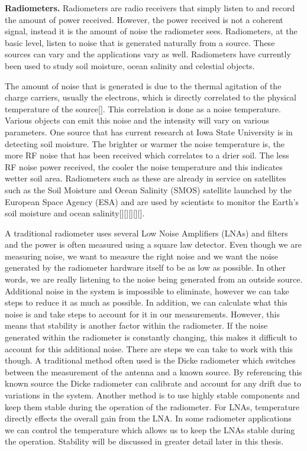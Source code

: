 \textbf{Radiometers.}  Radiometers are radio receivers that simply listen to and record the amount of power received.  However, the power received is not a coherent signal, instead it is the amount of noise the radiometer sees.  Radiometers, at the basic level, listen to noise that is generated naturally from a source.  These sources can vary and the applications vary as well.  Radiometers have currently been used to study soil moisture, ocean salinity and celestial objects.

The amount of noise that is generated is due to the thermal agitation of the charge carriers, usually the electrons, which is directly correlated to the physical temperature of the source[\cite{Nyquist1928thermal}].  This correlation is done as a noise temperature.  Various objects can emit this noise and the intensity will vary on various parameters.  One source that has current research at Iowa State University is in detecting soil moisture.  The brighter or warmer the noise temperature is, the more RF noise that has been received which correlates to a drier soil.  The less RF noise power received, the cooler the noise temperature and this indicates wetter soil area. Radiometers such as these are already in service on satellites such as the Soil Moisture and Ocean Salinity (SMOS) satellite launched by the European Space Agency (ESA) and are used by scientists to monitor the Earth's soil moisture and ocean salinity[\cite{Liu}][\cite{McMullan}][\cite{Ruf}][\cite{McIntyre}][\cite{Hardy}].  

A traditional radiometer uses several Low Noise Amplifiers (LNAs) and filters and the power is often measured using a square law detector.  Even though we are measuring noise, we want to measure the right noise and we want the noise generated by the radiometer hardware itself to be as low as possible.  In other words, we are really listening to the noise being generated from an outside source.  Additional noise in the system is impossible to eliminate, however we can take steps to reduce it as much as possible.  In addition, we can calculate what this noise is and take steps to account for it in our measurements.  However, this means that stability is another factor within the radiometer.  If the noise generated within the radiometer is constantly changing, this makes it difficult to account for this additional noise.  There are steps we can take to work with this though.  A traditional method often used is the Dicke radiometer which switches between the measurement of the antenna and a known source\cite{Dicke}.  By referencing this known source the Dicke radiometer can calibrate and account for any drift due to variations in the system.  Another method is to use highly stable components and keep them stable during the operation of the radiometer.  For LNAs, temperature directly effects the overall gain from the LNA.  In some radiometer applications we can control the temperature which allows us to keep the LNAs stable during the operation.  Stability will be discussed in greater detail later in this thesis.


